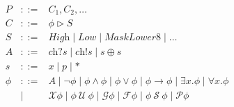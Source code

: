 \documentclass[10pt,conference,compsocconf]{IEEEtran}
\newcommand{\sch}{\textit{ch}}
\newcommand{\atom}{A}
\newcommand{\tr}{t\xspace}
\newcommand{\tnext}{\mathcal{X}}
\newcommand{\talways}{\mathcal{G}}
\newcommand{\tfuture}{\mathcal{F}}
\newcommand{\tuntil}{~\mathcal{U}~}
\newcommand{\tsince}{~\mathcal{S}~}
\newcommand{\tpast}{\mathcal{P}}
\newcommand{\limplies}{\rightarrow}
\begin{document}
\begin{figure}[!t]
  \small
  \begin{displaymath}
    \begin{array}{rcl}
      P & ::= & C_1, C_2, \ldots \\
      C & ::= & \phi \rhd S\\
      S & ::= & \textit{High} \mid \textit{Low} \mid
      \textit{MaskLower8} \mid \ldots \\ %
      \atom & ::= & \sch?s \mid \sch!s \mid s \oplus s \\
      s & ::= & x \mid p \mid \ast \\
      \phi & ::= &
      \atom
      \mid \neg \phi
      \mid \phi \wedge \phi
      \mid \phi \vee \phi
      \mid \phi \limplies \phi
      \mid \exists x.\phi 
      \mid \forall x.\phi \\
      & \mid &  \tnext \phi
      \mid \phi \tuntil \phi
      \mid \talways \phi 
      \mid \tfuture \phi 
      \mid \phi \tsince \phi
      \mid \tpast \phi
                         \\
    \end{array}
  \end{displaymath}

      




\end{figure}
\end{document}
